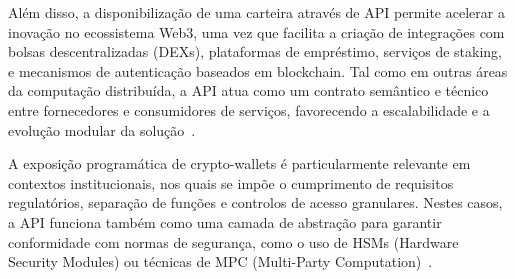 Além disso, a disponibilização de uma carteira através de API permite acelerar a inovação no ecossistema Web3, uma vez que facilita a criação de integrações com bolsas descentralizadas (DEXs), plataformas de empréstimo, serviços de staking, e mecanismos de autenticação baseados em blockchain. Tal como em outras áreas da computação distribuída, a API atua como um contrato semântico e técnico entre fornecedores e consumidores de serviços, favorecendo a escalabilidade e a evolução modular da solução~\cite{fielding2000, papazoglou2008}.

A exposição programática de crypto-wallets é particularmente relevante em contextos institucionais, nos quais se impõe o cumprimento de requisitos regulatórios, separação de funções e controlos de acesso granulares. Nestes casos, a API funciona também como uma camada de abstração para garantir conformidade com normas de segurança, como o uso de HSMs (Hardware Security Modules) ou técnicas de MPC (Multi-Party Computation)~\cite{boneh2019, anchoragempc2023}.
